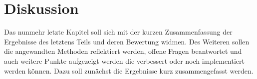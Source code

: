 \documentclass[12pt, a4paper]{scrbook}
\begin{document}
\let\cleardoublepage\relax
\chapter{Diskussion}
Das nunmehr letzte Kapitel soll sich mit der kurzen Zusammenfassung der Ergebnisse des letztens Teils und deren Bewertung widmen. Des Weiteren sollen die angewandten Methoden reflektiert werden, offene Fragen beantwortet und auch weitere Punkte aufgezeigt werden die verbessert oder noch implementiert werden können. Dazu soll zunächst die Ergebnisse kurz zusammengefasst werden.

\let\cleardoublepage\relax
\pagestyle{empty}
\newpage
\pagestyle{empty}
\printbibheading
\printbibliography[type=book,heading=subbibliography,title={Literaturquellen}]
\printbibliography[type=misc,heading=subbibliography,title={Online Quellen}]
\pagestyle{empty}
\newpage
\pagestyle{empty}
\end{document}

